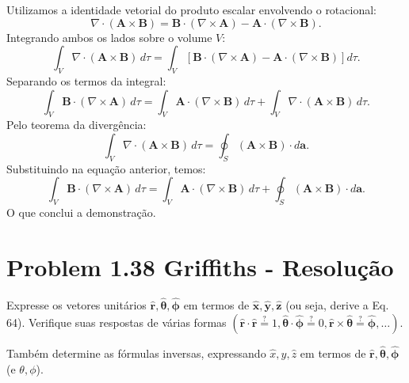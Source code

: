 \documentclass[a4paper,12pt]{article}
\begin{document}
Utilizamos a identidade vetorial do produto escalar envolvendo o rotacional:
\begin{equation}
\nabla \cdot (\mathbf{A} \times \mathbf{B}) = \mathbf{B} \cdot (\nabla \times \mathbf{A}) - \mathbf{A} \cdot (\nabla \times \mathbf{B}).
\end{equation}
Integrando ambos os lados sobre o volume \( V \):
\begin{equation}
\int_V \nabla \cdot (\mathbf{A} \times \mathbf{B}) \, d\tau =
\int_V \left[ \mathbf{B} \cdot (\nabla \times \mathbf{A}) - \mathbf{A} \cdot (\nabla \times \mathbf{B}) \right] d\tau.
\end{equation}
Separando os termos da integral:
\begin{equation}
\int_V \mathbf{B} \cdot (\nabla \times \mathbf{A}) \, d\tau =
\int_V \mathbf{A} \cdot (\nabla \times \mathbf{B}) \, d\tau +
\int_V \nabla \cdot (\mathbf{A} \times \mathbf{B}) \, d\tau.
\end{equation}
Pelo teorema da divergência:
\begin{equation}
\int_V \nabla \cdot (\mathbf{A} \times \mathbf{B}) \, d\tau = \oint_S (\mathbf{A} \times \mathbf{B}) \cdot d\mathbf{a}.
\end{equation}
Substituindo na equação anterior, temos:
\begin{equation}
\int_V \mathbf{B} \cdot (\nabla \times \mathbf{A}) \, d\tau =
\int_V \mathbf{A} \cdot (\nabla \times \mathbf{B}) \, d\tau +
\oint_S (\mathbf{A} \times \mathbf{B}) \cdot d\mathbf{a}.
\end{equation}
O que conclui a demonstração.


\section*{Problem 1.38 Griffiths - Resolu\c{c}\~ao}

Expresse os vetores unitários \( \hat{\mathbf{r}}, \hat{\bm{\theta}}, \hat{\bm{\phi}} \) em termos de \( \hat{\mathbf{x}}, \hat{\mathbf{y}}, \hat{\mathbf{z}} \) 
(ou seja, derive a Eq. 64). Verifique suas respostas de várias formas 
\(\left( \hat{\mathbf{r}} \cdot \hat{\mathbf{r}} \stackrel{?}{=} 1, \hat{\bm{\theta}} \cdot \hat{\bm{\phi}} \stackrel{?}{=} 0, \hat{\mathbf{r}} \times \hat{\bm{\theta}} \stackrel{?}{=} \hat{\bm{\phi}}, \dots \right)\).  

Também determine as fórmulas inversas, expressando \( \hat{x}, \hat{y}, \hat{z} \) em termos de \( \hat{\mathbf{r}}, \hat{\mathbf{\theta}}, \hat{\bm{\phi}} \) (e \( \theta, \phi \)).
\end{document}
